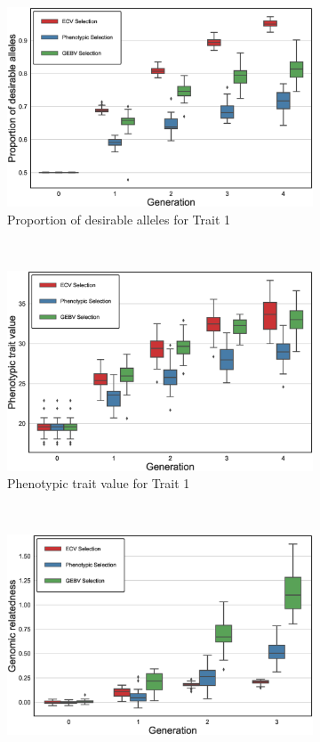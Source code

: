 \documentclass[12pt, a4paper, bibliography=totoc]{scrartcl}
\begin{document}
\begin{figure}[h!t]
    \centering
    \begin{subfigure}[h!t]{\textwidth}
    \centering
    \includegraphics[scale=0.3]{Figures/SO_proportion.eps}
    \caption{Proportion of desirable alleles for Trait 1}\label{fig.1a}
    \end{subfigure}\\
     \begin{subfigure}[h!t]{\textwidth}
     \centering
    \includegraphics[scale=0.3]{Figures/SO_pheno_values.eps}
    \caption{Phenotypic trait value for Trait 1}\label{fig.1b}
    \end{subfigure}\\
    \begin{subfigure}[h!t]{\textwidth}
    \centering
    \includegraphics[scale=0.3]{Figures/SO_inbreeding.eps}

\end{subfigure}
\end{figure}
\end{document}
